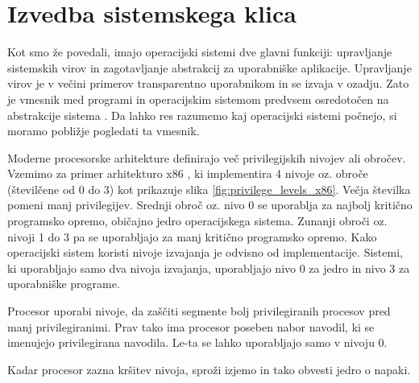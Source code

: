 \documentclass[a4paper,12pt,openright]{book}
\begin{document}

\section{Izvedba sistemskega klica} \label{sec:syscall_execution}

Kot smo že povedali, imajo operacijski sistemi dve glavni funkciji: upravljanje sistemskih virov in zagotavljanje abstrakcij za uporabniške aplikacije.
Upravljanje virov je v večini primerov transparentno uporabnikom in se izvaja v ozadju. Zato je vmesnik med programi in operacijskim sistemom predvsem osredotočen na abstrakcije sistema \cite{Tanenbaum_Bos_2023}.
Da lahko res razumemo kaj operacijski sistemi počnejo, si moramo pobližje pogledati ta vmesnik.

Moderne procesorske arhitekture definirajo več privilegijskih nivojev ali obročev.
Vzemimo za primer arhitekturo x86 \cite{Intel_2024}, ki implementira 4 nivoje oz. obroče (številčene od 0 do 3) kot prikazuje slika \ref{fig:privilege_levels_x86}.
Večja številka pomeni manj privilegijev.
Srednji obroč oz. nivo 0 se uporablja za najbolj kritično programsko opremo, običajno jedro operacijskega sistema.
Zunanji obroči oz. nivoji 1 do 3 pa se uporabljajo za manj kritično programsko opremo.
Kako operacijski sistem koristi nivoje izvajanja je odvisno od implementacije.
Sistemi, ki uporabljajo samo dva nivoja izvajanja, uporabljajo nivo 0 za jedro in nivo 3 za uporabniške programe.

Procesor uporabi nivoje, da zaščiti segmente bolj privilegiranih procesov pred manj privilegiranimi.
Prav tako ima procesor poseben nabor navodil, ki se imenujejo privilegirana navodila.
Le-ta se lahko uporabljajo samo v nivoju 0.

Kadar procesor zazna kršitev nivoja, sproži izjemo in tako obvesti jedro o napaki.
\end{document}
